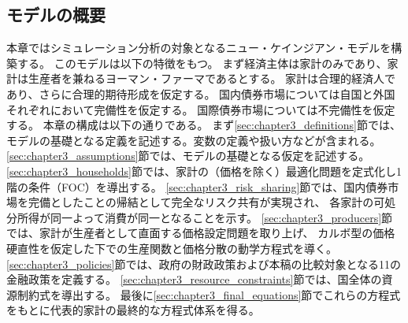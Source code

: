
\subsection{モデルの概要}
\label{sec:chapter3_overview}
本章ではシミュレーション分析の対象となるニュー・ケインジアン・モデルを構築する。
このモデルは以下の特徴をもつ。
まず経済主体は家計のみであり、家計は生産者を兼ねるヨーマン・ファーマであるとする。
家計は合理的経済人であり、さらに合理的期待形成を仮定する。
国内債券市場については自国と外国それぞれにおいて完備性を仮定する。
国際債券市場については不完備性を仮定する。
本章の構成は以下の通りである。
まず\ref{sec:chapter3_definitions}節では、モデルの基礎となる定義を記述する。変数の定義や扱い方などが含まれる。
\ref{sec:chapter3_assumptions}節では、モデルの基礎となる仮定を記述する。
\ref{sec:chapter3_households}節では、家計の（価格を除く）最適化問題を定式化し1階の条件（FOC）を導出する。
\ref{sec:chapter3_risk_sharing}節では、国内債券市場を完備としたことの帰結として完全なリスク共有が実現され、
各家計の可処分所得が同一よって消費が同一となることを示す。
\ref{sec:chapter3_producers}節では、家計が生産者として直面する価格設定問題を取り上げ、
カルボ型の価格硬直性を仮定した下での生産関数と価格分散の動学方程式を導く。
\ref{sec:chapter3_policies}節では、政府の財政政策および本稿の比較対象となる11の金融政策を定義する。
\ref{sec:chapter3_resource_constraints}節では、国全体の資源制約式を導出する。
最後に\ref{sec:chapter3_final_equations}節でこれらの方程式をもとに代表的家計の最終的な方程式体系を得る。